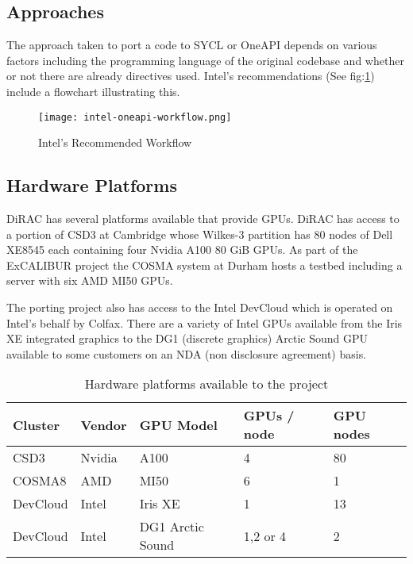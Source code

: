 
\subsection{Approaches}\label{sec:approaches}

The approach taken to port a code to SYCL or OneAPI\cite{intel_corp_oneapi_nodate} depends on various factors including the programming language of the original codebase and whether or not there are already directives used. Intel's recommendations (See fig:\ref{fig:intel-workflow}) include a flowchart illustrating this.

\begin{figure}[htb]
	\caption{Intel's Recommended Workflow}
	\texttt{[image: intel-oneapi-workflow.png]}
	\label{fig:intel-workflow} %
\end{figure}

\subsection{Hardware Platforms}

DiRAC has several platforms available that provide GPUs. DiRAC has access to a portion of CSD3 at Cambridge whose Wilkes-3 partition has 80 nodes of Dell XE8545 each containing four Nvidia A100 80 GiB GPUs. As part of the ExCALIBUR project the COSMA system at Durham hosts a testbed including a server with six AMD MI50 GPUs.

The porting project also has access to the Intel DevCloud which is operated on Intel's behalf by Colfax. There are a variety of Intel GPUs available from the Iris XE integrated graphics to the DG1 (discrete graphics) Arctic Sound GPU available to some customers on an NDA (non disclosure agreement) basis.

\begin{table}[htbp]
	\centering
	\begin{tabular}{lllll}
		Cluster  & Vendor & GPU Model        & GPUs / node & GPU nodes \\
		\hline  %
		CSD3     & Nvidia & A100             & 4           & 80        \\
		COSMA8   & AMD    & MI50             & 6           & 1         \\
		DevCloud & Intel  & Iris XE          & 1           & 13        \\
		DevCloud & Intel  & DG1 Arctic Sound & 1,2 or 4    & 2
	\end{tabular}
	\caption{Hardware platforms available to the project}
	\label{tab:GPUs} %
\end{table}

